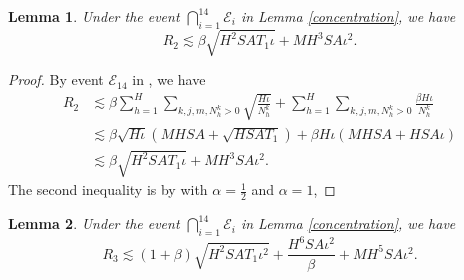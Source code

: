 \documentclass{article}
\newtheorem{lemma}{Lemma}[section]
\begin{document}
\begin{lemma}
    \label{upperboundr2}
    Under the event $\bigcap_{i=1}^{14}\mathcal{E}_i$ in Lemma \ref{concentration}, we have
    $$R_2 \lesssim \beta\sqrt{H^2SAT_1\iota} +MH^3SA\iota^2.$$
\end{lemma}
\begin{proof}
By event $\mathcal{E}_{14}$ in , we have
\begin{align*}
    R_2 &\lesssim \beta \sum_{h=1}^H\sum_{k,j,m,N_h^k >0}\sqrt{\frac{H\iota}{N_h^k}} + \sum_{h=1}^H\sum_{k,j,m,N_h^k >0}\frac{\beta H\iota}{N_h^k} \nonumber\\
    &\lesssim \beta\sqrt{H\iota}(MHSA+\sqrt{HSAT_1})+\beta H\iota(MHSA+HSA\iota) \nonumber\\
    &\lesssim \beta\sqrt{H^2SAT_1\iota} +MH^3SA\iota^2.
    \end{align*}
    The second inequality is by  with $\alpha = \frac{1}{2}$ and $\alpha = 1$,
\end{proof}
\begin{lemma}
    \label{upperboundr3}
    Under the event $\bigcap_{i=1}^{14}\mathcal{E}_i$ in Lemma \ref{concentration}, we have
    $$R_3 \lesssim (1+\beta) \sqrt{H^2SAT_1\iota^2} +\frac{H^6SA\iota^2}{\beta}+ MH^5SA\iota^2.$$
\end{lemma}
\end{document}
